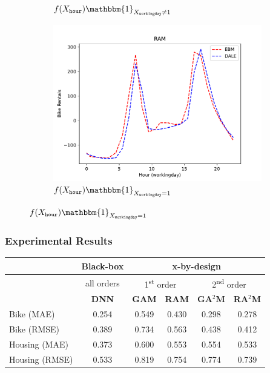 \documentclass{beamer}
\newcommand{\when}[1]{\mathbbm{1}_{#1}}
\begin{document}
\begin{frame}
\begin{figure}[htbp]
\begin{subfigure}{0.32\textwidth}
        \caption{\(f(X_{\mathtt{hour}}) \when{X_{\mathtt{workingday}} \neq 1}\)}
        \label{subfig:bike_rentals_regional_gam_1}
    \end{subfigure}
    \begin{subfigure}{0.32\textwidth}
        \centering
        \includegraphics[width=\textwidth]{figures/bike_rentals_ram_2}
        \caption{\(f(X_{\mathtt{hour}}) \when{X_{\mathtt{workingday}} = 1}\)}
        \label{subfig:bike_rentals_regional_gam_2}
    \end{subfigure}
    \label{fig:bike_sharing}
\end{figure}

\end{frame}


\begin{frame}
  \frametitle{Experimental Results}

\begin{table}[htbp]
  \centering
  \label{tab:sample}
  \begin{tabular}{l|c|cccc}
      & \textbf{Black-box} & \multicolumn{4}{c}{\textbf{x-by-design}} \\
      \hline
      \hline
      & all orders & \multicolumn{2}{c}{1\textsuperscript{st} order} & \multicolumn{2}{c}{2\textsuperscript{nd} order} \\
      \hline
      \hline
      & \textbf{DNN} & \textbf{GAM} & \textbf{RAM} & \textbf{GA}$^2$\textbf{M} & \textbf{RA}$^2$\textbf{M} \\
      \hline
      Bike (MAE)  & 0.254 & 0.549 & 0.430 & 0.298 & 0.278 \\
      Bike (RMSE) & 0.389 & 0.734 & 0.563 & 0.438 & 0.412 \\
      \hline
      Housing (MAE)  & 0.373 & 0.600 & 0.553 & 0.554 & 0.533 \\
      Housing (RMSE) & 0.533 & 0.819 & 0.754 & 0.774 & 0.739 \\
  \end{tabular}
\end{table}

\end{frame}
\end{document}
